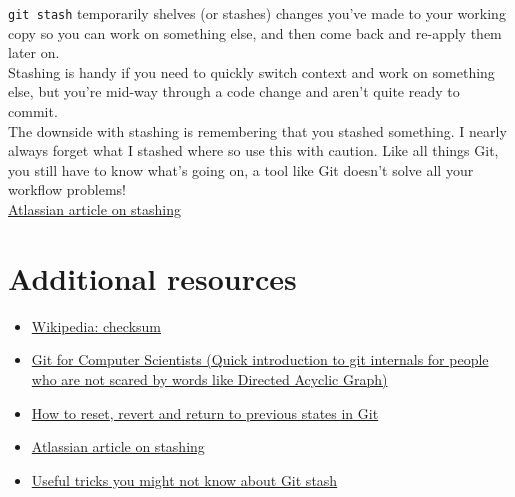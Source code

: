 \texttt{git stash} temporarily shelves (or stashes) changes you've made to your working copy so you can work on something else, and then come back and re-apply them later on. 
\\

Stashing is handy if you need to quickly switch context and work on something else, but you're mid-way through a code change and aren't quite ready to commit.
\\

The downside with stashing is remembering that you stashed something. I nearly always forget what I stashed where so use this with caution. Like all things Git, you still have to know what's going on, a tool like Git doesn't solve all your workflow problems!
\\

\href{https://www.atlassian.com/git/tutorials/saving-changes/git-stash}{Atlassian article on stashing}

\section{Additional resources}

\begin{itemize}[leftmargin=*]
    \item \href{https://en.wikipedia.org/wiki/Checksum}{Wikipedia: checksum}
	\item \href{https://eagain.net/articles/git-for-computer-scientists/}{Git for Computer Scientists (Quick introduction to git internals for people who are not scared by words like Directed Acyclic Graph)}
	\item \href{https://opensource.com/article/18/6/git-reset-revert-rebase-commands}{How to reset, revert and return to previous states in Git}
	\item \href{https://www.atlassian.com/git/tutorials/saving-changes/git-stash}{Atlassian article on stashing}
	\item \href{https://dev.to/srebalaji/useful-tricks-you-might-not-know-about-git-stash-117e}{Useful tricks you might not know about Git stash}
\end{itemize}


